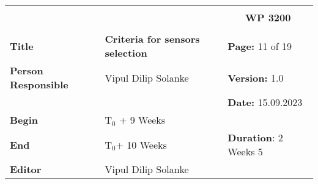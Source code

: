 \begin{table}[!h]
  \begin{center}
    \begin{tabular}{|p{35mm}||p{55mm}|p{50mm}||p{40mm}|}
      \hline
      \multicolumn{3}{|l||}{\textbf{}} & \multicolumn{1}{c|}{}                                                                                                                                                \\
      \multicolumn{3}{|l||}{\textbf{}} & \multicolumn{1}{c|}{\textbf{WP 3200}}                                                                                                                                \\
      \multicolumn{3}{|l||}{\textbf{}} & \multicolumn{1}{c|}{}                                                                                                                                                \\
      \hline\hline
      \textbf{Title}                   & \multicolumn{2}{p{7cm}||}{\textbf{Criteria for sensors selection}}
                                       & \textbf{Page:} 11 of 19                                                                                                                                            \\
      \hline
      \textbf{Person Responsible}        & \multicolumn{2}{l||}{Vipul Dilip Solanke}                                                                                                   & \textbf{Version:} 1.0   \\
      \hline
      \multicolumn{3}{|l||}{}          & \textbf{Date:} 15.09.2023                                                                                                                                          \\
      \hline\hline
      \textbf{Begin}                  & \multicolumn{2}{l||}{T$_0$ + 9 Weeks}                                                                                                                &                         \\
      \hline
      \textbf{End}                    & \multicolumn{2}{l||}{T$_0$+ 10 Weeks}                                                                                                        & \textbf{Duration}: 2 Weeks 5 \\
      \hline\hline
      \textbf{Editor}              & \multicolumn{3}{l|}{Vipul Dilip Solanke}                                                                                                                              \\

\end{tabular}
\end{center}
\end{table}
